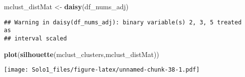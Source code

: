 \documentclass[]{article}
\newenvironment{Shaded}{\begin{snugshade}}{\end{snugshade}}
\newcommand{\KeywordTok}[1]{\textcolor[rgb]{0.13,0.29,0.53}{\textbf{#1}}}
\newcommand{\StringTok}[1]{\textcolor[rgb]{0.31,0.60,0.02}{#1}}
\newcommand{\NormalTok}[1]{#1}
\begin{document}
\begin{Shaded}
\begin{Highlighting}[]
\NormalTok{mclust_distMat <-}\StringTok{ }\KeywordTok{daisy}\NormalTok{(df_nums_adj)}
\end{Highlighting}
\end{Shaded}

\begin{verbatim}
## Warning in daisy(df_nums_adj): binary variable(s) 2, 3, 5 treated as
## interval scaled
\end{verbatim}

\begin{Shaded}
\begin{Highlighting}[]
\KeywordTok{plot}\NormalTok{(}\KeywordTok{silhouette}\NormalTok{(mclust_clusters,mclust_distMat))}
\end{Highlighting}
\end{Shaded}

\texttt{[image: Solo1\_files/figure-latex/unnamed-chunk-38-1.pdf]}
\end{document}
